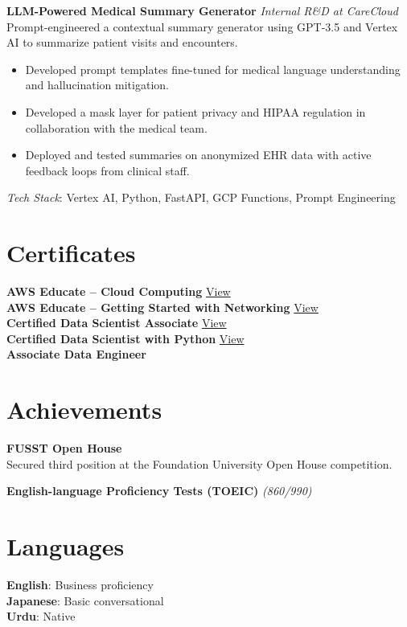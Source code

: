 \documentclass[a4paper,11pt]{article}
\begin{document}
\vspace{6pt}

\textbf{LLM-Powered Medical Summary Generator} \hfill \textit{Internal R\&D at CareCloud} \\
Prompt-engineered a contextual summary generator using GPT-3.5 and Vertex AI to summarize patient visits and encounters.
\begin{itemize}[leftmargin=*, noitemsep, nolistsep]
    \item Developed prompt templates fine-tuned for medical language understanding and hallucination mitigation.
    \item Developed a mask layer for patient privacy and HIPAA regulation in collaboration with the medical team.
    \item Deployed and tested summaries on anonymized EHR data with active feedback loops from clinical staff.
\end{itemize}
\textit{Tech Stack}: Vertex AI, Python, FastAPI, GCP Functions, Prompt Engineering


\section*{Certificates}
\textbf{AWS Educate – Cloud Computing}
\hfill
\href{https://aws.amazon.com/education/awseducate/}{View} \\
\textbf{AWS Educate – Getting Started with Networking}
\hfill
\href{https://aws.amazon.com/education/awseducate/}{View} \\
\textbf{Certified Data Scientist Associate}
\hfill
\href{https://www.datacamp.com/certificate/DSA0012637301766}{View} \\[4pt]
\textbf{Certified Data Scientist with Python}
\hfill
\href{https://www.datacamp.com/certificate/PDA0014190164566}{View} \\
\textbf{Associate Data Engineer} \\

\section*{Achievements}
\textbf{FUSST Open House}
\hfill \\
Secured third position at the Foundation University Open House competition.

\textbf{English-language Proficiency Tests (TOEIC)} \hfill \textit{(860/990)}

\section*{Languages}
\textbf{English}: Business proficiency \\
\textbf{Japanese}: Basic conversational \\
\textbf{Urdu}: Native
\end{document}
